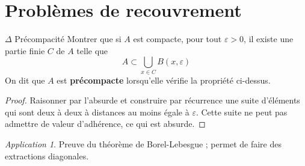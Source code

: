 \documentclass[french,a4paper]{article}
\theoremstyle{plain}
\theoremstyle{definition}
\theoremstyle{remark}
\newtheorem*{app}{Application}
\begin{document}
\section{Problèmes de recouvrement}

\begin{ex}{$\Delta$ Précompacité} Montrer que si $A$ est compacte, pour tout $\varepsilon>0$, il existe une partie finie $C$ de $A$ telle que $$A\subset\bigcup_{x\in C}B(x,\varepsilon)$$ On dit que $A$ est \textbf{précompacte} lorsqu'elle vérifie la propriété ci-dessus.
\end{ex}
\begin{proof}
	Raisonner par l'absurde et construire par récurrence une suite d'éléments qui sont deux à deux à distances au moins égale à $\varepsilon$. Cette suite ne peut pas admettre de valeur d'adhérence, ce qui est absurde.
\end{proof}
\begin{app}
	Preuve du théorème de Borel-Lebesgue ; permet de faire des extractions diagonales.
\end{app}
\end{document}
